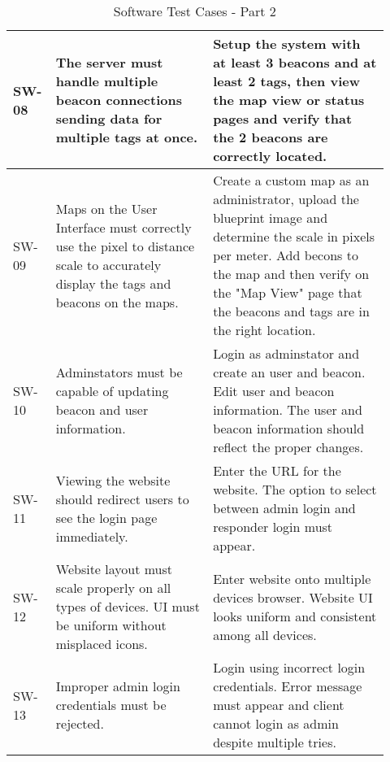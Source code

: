 \pagebreak
\bgroup
\def\arraystretch{1.25}
\begin{table}[h!]
    \centering
    \begin{tabular}{|p{0.07\linewidth}|p{0.40\linewidth}|p{0.45\linewidth}|}

    \hline
    SW-08
    & The server must handle multiple beacon connections sending data for multiple tags at once.
    & Setup the system with at least 3 beacons and at least 2 tags, then view the map view or status pages and verify that the 2 beacons are correctly located. \\

    \hline
    SW-09
    & Maps on the User Interface must correctly use the pixel to distance scale to accurately display the tags and beacons on the maps.
    & Create a custom map as an administrator, upload the blueprint image and determine the scale in pixels per meter. Add becons to the map and then verify on the "Map View" page that the beacons and tags are in the right location. \\
    
    \hline
    SW-10
    & Adminstators must be capable of updating beacon and user information. 
    & Login as adminstator and create an user and beacon. Edit user and beacon information. The user and beacon information should reflect the proper changes. \\
    
    \hline
    SW-11
    & Viewing the website should redirect users to see the login page immediately.
    & Enter the URL for the website. The option to select between admin login and responder login must appear. \\

    \hline
    SW-12
    & Website layout must scale properly on all types of devices. UI must be uniform without misplaced icons.
    & Enter website onto multiple devices browser. Website UI looks uniform and consistent among all devices. \\

    \hline
    SW-13
    & Improper admin login credentials must be rejected.
    & Login using incorrect login credentials. Error message must appear and client cannot login as admin despite multiple tries. \\
    
    \hline
    \end{tabular}
    \caption{Software Test Cases - Part 2}
\end{table}
